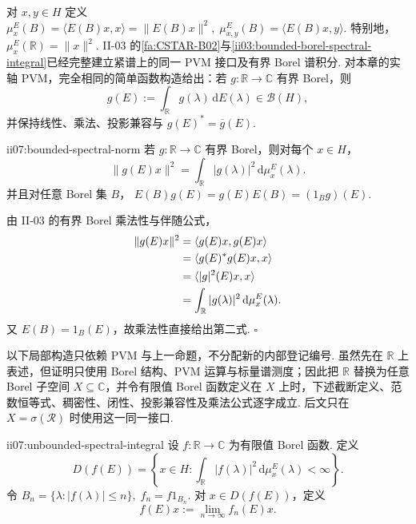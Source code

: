 对 \(\displaystyle x,y\in H\) 定义
\(\displaystyle \mu_x^E(B)=\langle E(B)x,x\rangle=\|E(B)x\|^2, \; \mu_{x,y}^E(B)=\langle E(B)x,y\rangle.\)
特别地，
\(\displaystyle \mu_x^E(\mathbb R)=\|x\|^2.\)
II-03 的\autoref{fa:CSTAR-B02}与\autoref{ii03:bounded-borel-spectral-integral}已经完整建立紧谱上的同一 PVM 接口及有界 Borel 谱积分. 对本章的实轴 PVM，完全相同的简单函数构造给出：若 \(\displaystyle g:\mathbb R\to\mathbb C\) 有界 Borel，则
\[
g(E):=\int_{\mathbb R}g(\lambda)\,\mathrm{d}E(\lambda)\in\mathcal B(H),
\]
并保持线性、乘法、投影兼容与
\(\displaystyle g(E)^*=\overline g(E).\)

\begin{FAProposition}[B][有界谱积分的向量范数恒等式]{ii07:bounded-spectral-norm}
若 \(\displaystyle g:\mathbb R\to\mathbb C\) 有界 Borel，则对每个 \(\displaystyle x\in H\)，
\[
\|g(E)x\|^2
=
\int_{\mathbb R}|g(\lambda)|^2\,\mathrm{d}\mu_x^E(\lambda).
\]
并且对任意 Borel 集 \(\displaystyle B\)，
\(\displaystyle E(B)g(E)=g(E)E(B)=(1_Bg)(E).\)
\end{FAProposition}

\begin{FAProof}
由 II-03 的有界 Borel 乘法性与伴随公式，
\[
\begin{aligned}
\displaystyle \|g(E)x\|^2 &\displaystyle =\langle g(E)x,g(E)x\rangle\\
\displaystyle &\displaystyle =\langle g(E)^*g(E)x,x\rangle\\
\displaystyle &\displaystyle =\langle |g|^2(E)x,x\rangle\\
\displaystyle &\displaystyle =\int_{\mathbb R}|g(\lambda)|^2\,\mathrm{d}\mu_x^E(\lambda).
\end{aligned}
\]
又 \(\displaystyle E(B)=1_B(E)\)，故乘法性直接给出第二式.
\hfill\(\square\)
\end{FAProof}

以下局部构造只依赖 PVM 与上一命题，不分配新的内部登记编号. 虽然先在 \(\displaystyle\mathbb R\) 上表述，但证明只使用 Borel 结构、PVM 运算与标量谱测度；因此把 \(\displaystyle\mathbb R\) 替换为任意 Borel 子空间 \(\displaystyle X\subseteq\mathbb C\)，并令有限值 Borel 函数定义在 \(\displaystyle X\) 上时，下述截断定义、范数恒等式、稠密性、闭性、投影兼容性及乘法公式逐字成立. 后文只在 \(\displaystyle X=\sigma(\mathcal R)\) 时使用这一同一接口.

\begin{FADefinition}[B][无界谱积分]{ii07:unbounded-spectral-integral}
设 \(\displaystyle f:\mathbb R\to\mathbb C\) 为有限值 Borel 函数. 定义
\[
D(f(E))
=
\left\{
 x\in H:
 \int_{\mathbb R}|f(\lambda)|^2\,\mathrm{d}\mu_x^E(\lambda)<\infty
\right\}.
\]
令
\(\displaystyle B_n=\{\lambda:|f(\lambda)|\leqslant n\}, \; f_n=f1_{B_n}.\)
对 \(\displaystyle x\in D(f(E))\)，定义
\[
f(E)x
:=
\lim_{n\to\infty}f_n(E)x.
\]
\end{FADefinition}

